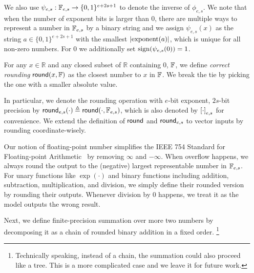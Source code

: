 We also use $\psi_{e,s}:\mathbb{F}_{e,s}\to \{0,1\}^{e+2s+1}$ to denote the inverse of $\phi_{e,s}$. We note that when the number of exponent bits is larger than $0$, there are multiple ways to represent a number in $\mathbb{F}_{e,s}$ by a binary string and we assign $\psi_{e,s}(x)$ as the string $a\in\{0,1\}^{e+2s+1}$ with the smallest $\left| \mathrm{exponent}(a) \right|$, which is unique for all non-zero numbers. For $0$ we additionally set $\operatorname*{sign}(\psi_{e,s}(0))=1$. 

\begin{definition}\label{defi:rounding} 
	 For any $x\in \mathbb{R}$ and any closed subset of $\mathbb{R}$ containing $0$, $\mathbb{F}$, we define \emph{correct rounding} $\mathsf{round}(x,\mathbb{F})$ as the closest number to $x$ in $\mathbb{F}$. We break the tie by picking the one with a smaller absolute value. 
 
 In particular, we denote the rounding operation with $e$-bit exponent, $2s$-bit precision by $\mathsf{round}_{e,s}(\cdot)\triangleq \mathsf{round}(\cdot,\mathbb{F}_{e,s})$, which is also denoted by $\left[\cdot\right]_{e,s}$ for convenience. We extend the definition of $\mathsf{round}$ and $\mathsf{round}_{e,s}$ to vector inputs by rounding coordinate-wisely. 
\end{definition} 

Our notion of floating-point number simplifies the IEEE 754 Standard for Floating-point Arithmetic~\citep{ieee754_2008} by removing $\infty$ and $-\infty$. When overflow happens, we always round the output to the (negative) largest representable number in $\mathbb{F}_{e,s}$. For unary functions like $\exp(\cdot)$ and binary functions including addition, subtraction, multiplication, and division, we simply define their rounded version by rounding their outputs. Whenever division by $0$ happens, we treat it as the model outputs the wrong result.

 Next, we define finite-precision summation over more two numbers by decomposing it as a chain of rounded binary addition in a fixed order. \footnote{Technically speaking, instead of a chain, the summation could also proceed like a tree. This is a more complicated case and we leave it for future work. }

